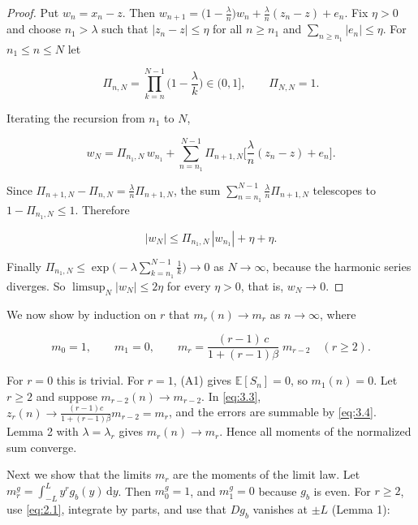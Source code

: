 \documentclass[aip,jmp,preprint,onecolumn,floatfix,superscriptaddress,nofootinbib,11pt]{revtex4-2}
\theoremstyle{plain}
\theoremstyle{remark}
\numberwithin{equation}{section}
\newcommand{\dd}{\mathrm{d}}
\newcommand{\E}{\mathbb{E}}
\begin{document}
\begin{proof} Put $w_n=x_n-z$. Then $w_{n+1}=\big(1-\tfrac\lambda n\big)w_n+\tfrac\lambda n(z_n-z)+e_n$. Fix $\eta>0$ and choose $n_1>\lambda$ such that $|z_n-z|\le\eta$ for all $n\ge n_1$ and $\sum_{n\ge n_1}|e_n|\le\eta$. For $n_1\le n\le N$ let

\begin{equation*}
\Pi_{n,N}=\prod_{k=n}^{N-1}\Big(1-\frac\lambda k\Big)\in(0,1],\qquad \Pi_{N,N}=1 .
\end{equation*}

Iterating the recursion from $n_1$ to $N$,

\begin{equation*}
w_N=\Pi_{n_1,N}\,w_{n_1}+\sum_{n=n_1}^{N-1}\Pi_{n+1,N}\Big[\frac\lambda n(z_n-z)+e_n\Big].
\end{equation*}

Since $\Pi_{n+1,N}-\Pi_{n,N}=\tfrac\lambda n \Pi_{n+1,N}$, the sum $\sum_{n=n_1}^{N-1}\tfrac\lambda n\Pi_{n+1,N}$ telescopes to $1-\Pi_{n_1,N}\le1$. Therefore

\begin{equation*}
|w_N|\le \Pi_{n_1,N}\,|w_{n_1}|+\eta+\eta .
\end{equation*}

Finally $\Pi_{n_1,N}\le\exp\big(-\lambda\sum_{k=n_1}^{N-1}\tfrac1k\big)\to0$ as $N\to\infty$, because the harmonic series diverges. So $\limsup_N|w_N|\le2\eta$ for every $\eta>0$, that is, $w_N\to0$. 
\end{proof}

We now show by induction on $r$ that $m_r(n)\to m_r$ as $n\to\infty$, where

\begin{equation}
m_0=1,\qquad m_1=0,\qquad m_r=\frac{(r-1)\,c}{1+(r-1)\beta}\;m_{r-2}\quad(r\ge2).
\label{eq:3.5}
\end{equation}

For $r=0$ this is trivial. For $r=1$, (A1) gives $\E[S_n]=0$, so $m_1(n)=0$. Let $r\ge2$ and suppose $m_{r-2}(n)\to m_{r-2}$. In \eqref{eq:3.3}, $z_r(n)\to\tfrac{(r-1)c}{1+(r-1)\beta}m_{r-2}=m_r$, and the errors are summable by \eqref{eq:3.4}. Lemma 2 with $\lambda=\lambda_r$ gives $m_r(n)\to m_r$. Hence all moments of the normalized sum converge.

Next we show that the limits $m_r$ are the moments of the limit law. Let $m_r^{g}=\int_{-L}^{L}y^{r}g_b(y)\,\dd y$. Then $m_0^{g}=1$, and $m_1^{g}=0$ because $g_b$ is even. For $r\ge2$, use \eqref{eq:2.1}, integrate by parts, and use that $Dg_b$ vanishes at $\pm L$ (Lemma 1):
\end{document}
